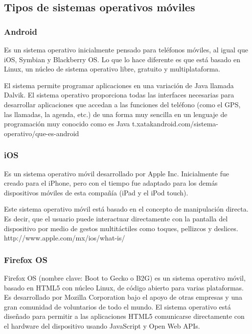 \setlength{\parskip}{0mm}
\subsection{Tipos de sistemas operativos móviles}

\subsubsection{Android} 
\setlength{\parskip}{5mm}
Es un sistema operativo inicialmente pensado para teléfonos móviles, al igual que iOS, Symbian y Blackberry OS. Lo que lo hace diferente es que está basado en Linux, un núcleo de sistema operativo libre, gratuito y multiplataforma.

El sistema permite programar aplicaciones en una variación de Java llamada Dalvik. El sistema operativo proporciona todas las interfaces necesarias para desarrollar aplicaciones que accedan a las funciones del teléfono (como el GPS, las llamadas, la agenda, etc.) de una forma muy sencilla en un lenguaje de programación muy conocido como es Java
\setlength{\parskip}{0mm}
t.xatakandroid.com/sistema-operativo/que-es-android

\subsubsection{iOS} 
\setlength{\parskip}{5mm}
Es un sistema operativo móvil desarrollado por Apple Inc. Inicialmente fue creado para el iPhone, pero con el tiempo fue adaptado para los demás dispositivos móviles de esta compañía (iPad y el iPod touch).

Este sistema operativo móvil está basado en el concepto de manipulación directa. Es decir, que el usuario puede interactuar directamente con la pantalla del dispositivo por medio de gestos multitáctiles como toques, pellizcos y deslices.
\setlength{\parskip}{0mm}
http://www.apple.com/mx/ios/what-is/


\subsubsection{Firefox OS}
\setlength{\parskip}{5mm}
Firefox OS (nombre clave: Boot to Gecko o B2G) es un sistema operativo móvil, basado en HTML5 con núcleo Linux, de código abierto para varias plataformas. Es desarrollado por Mozilla Corporation bajo el apoyo de otras empresas y una gran comunidad de voluntarios de todo el mundo. El sistema operativo está diseñado para permitir a las aplicaciones HTML5 comunicarse directamente con el hardware del dispositivo usando JavaScript y Open Web APIs.

